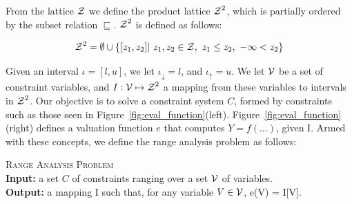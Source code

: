 \documentclass{llncs}
\newcommand{\lb}[1]{#1_{\downarrow}}
\newcommand{\ub}[1]{#1_{\uparrow}}
\newcommand{\varset}[1]{\mbox{$\cal{#1}$}}
\begin{document}
From the lattice $\varset{Z}$ we define the product lattice
$\varset{Z}^2$, which is partially ordered by the subset relation
$\sqsubseteq$.
$\varset{Z}^2$ is defined as follows:

\begin{equation*}
\varset{Z}^2 = \emptyset \cup \{[z_1, z_2] | \ z_1,z_2 \in \varset{Z},
\ z_1 \leq z_2, \  -\infty < z_2 \}
\end{equation*}

Given an interval $\iota = [l, u]$, we let $\lb{\iota} = l$, and
$\ub{\iota} = u$.
We let \varset{V} be a set of constraint variables, and
$I: \varset{V} \mapsto \varset{Z}^2$ a
mapping from these variables to intervals in $\varset{Z}^2$.
Our objective is to solve a constraint system $C$, formed by constraints such
as those seen in Figure~\ref{fig:eval_function}(left).
Figure~\ref{fig:eval_function}(right) defines a valuation function $e$ that
computes $Y = f(\ldots)$, given I.
Armed with these concepts, we define the range analysis problem as follows:

\begin{definition}
\label{def:rcp}
\textsc{Range Analysis Problem} \\
\textbf{Input:} a set $C$ of constraints ranging over a set \varset{V} of
variables. \\
\textbf{Output:} a mapping I such that, for any variable
$V \in \varset{V}$, e(V) = I[V].
\end{definition}
\end{document}
